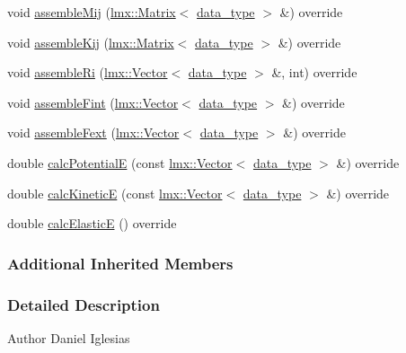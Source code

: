 \begin{DoxyCompactItemize}
\item 
void \hyperlink{classmknix_1_1_gauss_point3_d_a6fae5b9fef24731052126e8c8163367e}{assemble\+Mij} (\hyperlink{classlmx_1_1_matrix}{lmx\+::\+Matrix}$<$ \hyperlink{namespacemknix_a16be4b246fbf2cceb141e3a179111020}{data\+\_\+type} $>$ \&) override
\item 
void \hyperlink{classmknix_1_1_gauss_point3_d_aff076d32e113b7cce73e255c300a9a56}{assemble\+Kij} (\hyperlink{classlmx_1_1_matrix}{lmx\+::\+Matrix}$<$ \hyperlink{namespacemknix_a16be4b246fbf2cceb141e3a179111020}{data\+\_\+type} $>$ \&) override
\item 
void \hyperlink{classmknix_1_1_gauss_point3_d_aacaa2d2787e1bf8f693ef651cc7820ca}{assemble\+Ri} (\hyperlink{classlmx_1_1_vector}{lmx\+::\+Vector}$<$ \hyperlink{namespacemknix_a16be4b246fbf2cceb141e3a179111020}{data\+\_\+type} $>$ \&, int) override
\item 
void \hyperlink{classmknix_1_1_gauss_point3_d_ac999276ddeda63e59b87dbea697f7721}{assemble\+Fint} (\hyperlink{classlmx_1_1_vector}{lmx\+::\+Vector}$<$ \hyperlink{namespacemknix_a16be4b246fbf2cceb141e3a179111020}{data\+\_\+type} $>$ \&) override
\item 
void \hyperlink{classmknix_1_1_gauss_point3_d_ae09d2af21a67fd202c45d9499c4b9fe0}{assemble\+Fext} (\hyperlink{classlmx_1_1_vector}{lmx\+::\+Vector}$<$ \hyperlink{namespacemknix_a16be4b246fbf2cceb141e3a179111020}{data\+\_\+type} $>$ \&) override
\item 
double \hyperlink{classmknix_1_1_gauss_point3_d_aedda1028e8eae297cb2b0a8dcd72b0f8}{calc\+Potential\+E} (const \hyperlink{classlmx_1_1_vector}{lmx\+::\+Vector}$<$ \hyperlink{namespacemknix_a16be4b246fbf2cceb141e3a179111020}{data\+\_\+type} $>$ \&) override
\item 
double \hyperlink{classmknix_1_1_gauss_point3_d_a9787d14c30b6cb5558cf16ac620a0524}{calc\+Kinetic\+E} (const \hyperlink{classlmx_1_1_vector}{lmx\+::\+Vector}$<$ \hyperlink{namespacemknix_a16be4b246fbf2cceb141e3a179111020}{data\+\_\+type} $>$ \&) override
\item 
double \hyperlink{classmknix_1_1_gauss_point3_d_a0ae56804d7f50d4d810421b85364dc28}{calc\+Elastic\+E} () override
\end{DoxyCompactItemize}
\subsubsection*{Additional Inherited Members}


\subsubsection{Detailed Description}
\begin{DoxyAuthor}{Author}
Daniel Iglesias 
\end{DoxyAuthor}


